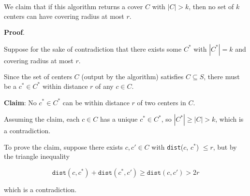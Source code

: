 \documentclass[12pt]{article}
\begin{document}
  We claim that if this algorithm returns a cover $C$ with $|C| > k$, then no
  set of $k$ centers can have covering radius at most $r$.

  {\bf Proof}.

  Suppose for the sake of contradiction that there exists some $C^*$ with $|C^*|
  = k$ and covering radius at most $r$.

  Since the set of centers $C$ (output by the algorithm) satisfies $C \subseteq
  S$, there must be a $c^* \in C^*$ within distance $r$ of any $c \in C$.

  {\bf Claim}: No $c^* \in C^*$ can be within distance $r$ of two centers in
  $C$.

  Assuming the claim, each $c \in C$ has a unique $c^* \in C^*$, so $|C^*| \ge
  |C| > k$, which is a contradiction.

  To prove the claim, suppose there exists $c, c' \in C$ with \texttt{dist}($c$,
  $c^*$) $\le r$, but by the triangle inequality 

  \[
    \texttt{dist}(c, c^*) + \texttt{dist}(c^*, c') \ge \texttt{dist}(c, c') > 2r
  \]

  which is a contradiction.
\end{document}
